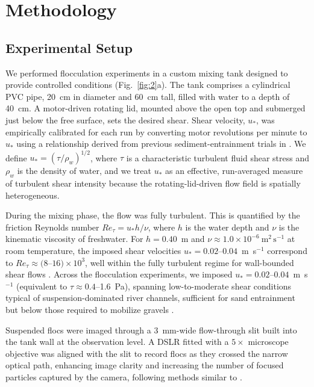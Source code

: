 \documentclass{agujournal2019}
\begin{document}
\section{Methodology}

\subsection{Experimental Setup}

We performed flocculation experiments in a custom mixing tank designed to provide controlled conditions (Fig.~\ref{fig:2}a). The tank comprises a cylindrical PVC pipe, 20~cm in diameter and 60~cm tall, filled with water to a depth of 40~cm. A motor-driven rotating lid, mounted above the open top and submerged just below the free surface, sets the desired shear. Shear velocity, $u_*$, was empirically calibrated for each run by converting motor revolutions per minute to $u_*$ using a relationship derived from previous sediment-entrainment trials in . We define $u_* = (\tau/\rho_w)^{1/2}$, where $\tau$ is a characteristic turbulent fluid shear stress and $\rho_w$ is the density of water, and we treat $u_*$ as an effective, run-averaged measure of turbulent shear intensity because the rotating-lid-driven flow field is spatially heterogeneous.

During the mixing phase, the flow was fully turbulent. This is quantified by the friction Reynolds number $Re_{\tau} = u_* h / \nu$, where $h$ is the water depth and $\nu$ is the kinematic viscosity of freshwater. For $h = 0.40$~m and $\nu \approx 1.0 \times 10^{-6}\ \mathrm{m^2\,s^{-1}}$ at room temperature, the imposed shear velocities $u_* = 0.02$--$0.04$~m~s$^{-1}$ correspond to $Re_{\tau} \approx (8$--$16)\times10^{3}$, well within the fully turbulent regime for wall-bounded shear flows \cite{Pope2000,Schlichting2000}. Across the flocculation experiments, we imposed $u_* = 0.02$--$0.04$~m~s$^{-1}$ (equivalent to $\tau \approx 0.4$--1.6~Pa), spanning low-to-moderate shear conditions typical of suspension-dominated river channels, sufficient for sand entrainment but below those required to mobilize gravels \cite{julien2018river}.

Suspended flocs were imaged through a 3~mm-wide flow-through slit built into the tank wall at the observation level. A DSLR fitted with a $5\times$ microscope objective was aligned with the slit to record flocs as they crossed the narrow optical path, enhancing image clarity and increasing the number of focused particles captured by the camera, following methods similar to .
\end{document}

